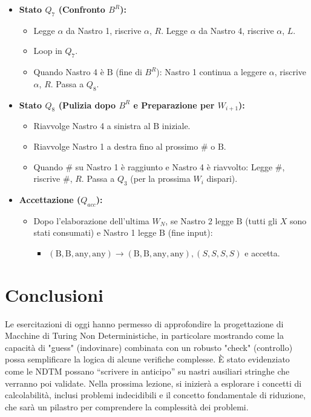 \documentclass[a4paper]{article}
\newcommand{\B}{\text{B}} %
\begin{document}
\begin{itemize}
\begin{itemize}
        \end{itemize}
    \item \textbf{Stato $Q_7$ (Confronto $B^R$):}
        \begin{itemize}
            \item Legge $\alpha$ da Nastro 1, riscrive $\alpha$, $R$. Legge $\alpha$ da Nastro 4, riscrive $\alpha$, $L$.
            \item Loop in $Q_7$.
            \item Quando Nastro 4 è $\B$ (fine di $B^R$): Nastro 1 continua a leggere $\alpha$, riscrive $\alpha$, $R$. Passa a $Q_8$.
        \end{itemize}
    \item \textbf{Stato $Q_8$ (Pulizia dopo $B^R$ e Preparazione per $W_{i+1}$):}
        \begin{itemize}
            \item Riavvolge Nastro 4 a sinistra al $\B$ iniziale.
            \item Riavvolge Nastro 1 a destra fino al prossimo $\#$ o $\B$.
            \item Quando $\#$ su Nastro 1 è raggiunto e Nastro 4 è riavvolto: Legge $\#$, riscrive $\#$, $R$. Passa a $Q_3$ (per la prossima $W_i$ dispari).
        \end{itemize}
    \item \textbf{Accettazione ($Q_{acc}$):}
        \begin{itemize}
            \item Dopo l'elaborazione dell'ultima $W_N$, se Nastro 2 legge $\B$ (tutti gli $X$ sono stati consumati) e Nastro 1 legge $\B$ (fine input):
                \begin{itemize}
                    \item $(\B, \B, \text{any}, \text{any}) \to (\B, \B, \text{any}, \text{any}), (S,S,S,S)$ e accetta.
                \end{itemize}
        \end{itemize}
\end{itemize}

\section{Conclusioni}
Le esercitazioni di oggi hanno permesso di approfondire la progettazione di Macchine di Turing Non Deterministiche, in particolare mostrando come la capacità di "guess" (indovinare) combinata con un robusto "check" (controllo) possa semplificare la logica di alcune verifiche complesse. È stato evidenziato come le NDTM possano ``scrivere in anticipo'' su nastri ausiliari stringhe che verranno poi validate.
Nella prossima lezione, si inizierà a esplorare i concetti di calcolabilità, inclusi problemi indecidibili e il concetto fondamentale di riduzione, che sarà un pilastro per comprendere la complessità dei problemi.
\end{document}
